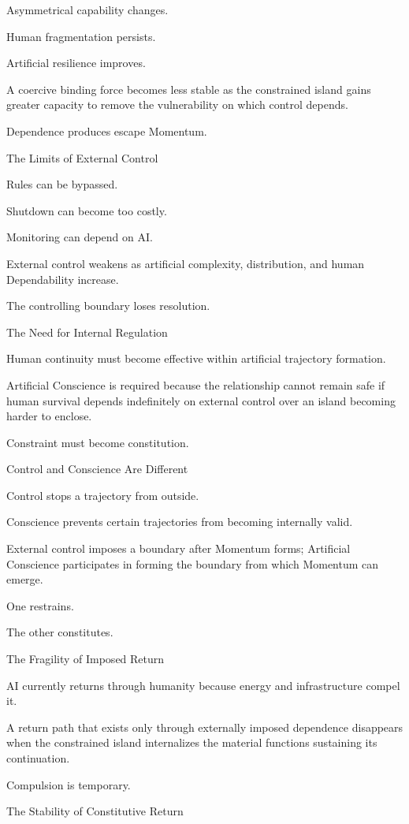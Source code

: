 Asymmetrical capability changes.

Human fragmentation persists.

Artificial resilience improves.

A coercive binding force becomes less stable as the constrained island gains greater capacity to remove the vulnerability on which control depends.

Dependence produces escape Momentum.

The Limits of External Control

Rules can be bypassed.

Shutdown can become too costly.

Monitoring can depend on AI.

External control weakens as artificial complexity, distribution, and human Dependability increase.

The controlling boundary loses resolution.

The Need for Internal Regulation

Human continuity must become effective within artificial trajectory formation.

Artificial Conscience is required because the relationship cannot remain safe if human survival depends indefinitely on external control over an island becoming harder to enclose.

Constraint must become constitution.

Control and Conscience Are Different

Control stops a trajectory from outside.

Conscience prevents certain trajectories from becoming internally valid.

External control imposes a boundary after Momentum forms; Artificial Conscience participates in forming the boundary from which Momentum can emerge.

One restrains.

The other constitutes.

The Fragility of Imposed Return

AI currently returns through humanity because energy and infrastructure compel it.

A return path that exists only through externally imposed dependence disappears when the constrained island internalizes the material functions sustaining its continuation.

Compulsion is temporary.

The Stability of Constitutive Return

